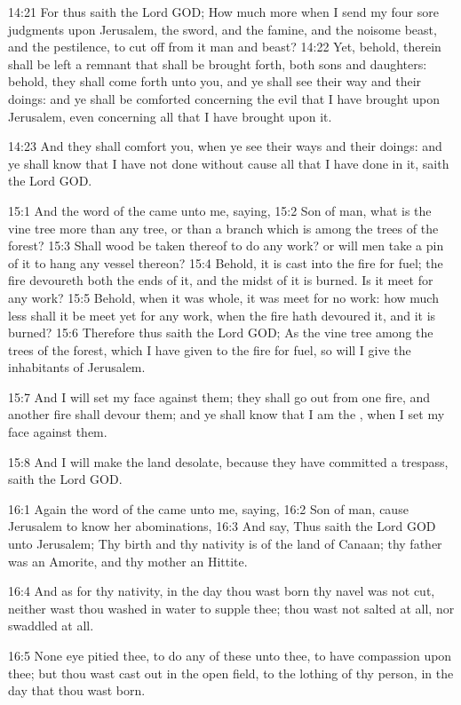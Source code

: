 14:21 For thus saith the Lord GOD; How much more when I send my four
sore judgments upon Jerusalem, the sword, and the famine, and the
noisome beast, and the pestilence, to cut off from it man and beast?
14:22 Yet, behold, therein shall be left a remnant that shall be
brought forth, both sons and daughters: behold, they shall come forth
unto you, and ye shall see their way and their doings: and ye shall be
comforted concerning the evil that I have brought upon Jerusalem, even
concerning all that I have brought upon it.

14:23 And they shall comfort you, when ye see their ways and their
doings: and ye shall know that I have not done without cause all that
I have done in it, saith the Lord GOD.

15:1 And the word of the \LORD came unto me, saying, 15:2 Son of man,
what is the vine tree more than any tree, or than a branch which is
among the trees of the forest?  15:3 Shall wood be taken thereof to do
any work? or will men take a pin of it to hang any vessel thereon?
15:4 Behold, it is cast into the fire for fuel; the fire devoureth
both the ends of it, and the midst of it is burned. Is it meet for any
work?  15:5 Behold, when it was whole, it was meet for no work: how
much less shall it be meet yet for any work, when the fire hath
devoured it, and it is burned?  15:6 Therefore thus saith the Lord
GOD; As the vine tree among the trees of the forest, which I have
given to the fire for fuel, so will I give the inhabitants of
Jerusalem.

15:7 And I will set my face against them; they shall go out from one
fire, and another fire shall devour them; and ye shall know that I am
the \LORD, when I set my face against them.

15:8 And I will make the land desolate, because they have committed a
trespass, saith the Lord GOD.

16:1 Again the word of the \LORD came unto me, saying, 16:2 Son of man,
cause Jerusalem to know her abominations, 16:3 And say, Thus saith the
Lord GOD unto Jerusalem; Thy birth and thy nativity is of the land of
Canaan; thy father was an Amorite, and thy mother an Hittite.

16:4 And as for thy nativity, in the day thou wast born thy navel was
not cut, neither wast thou washed in water to supple thee; thou wast
not salted at all, nor swaddled at all.

16:5 None eye pitied thee, to do any of these unto thee, to have
compassion upon thee; but thou wast cast out in the open field, to the
lothing of thy person, in the day that thou wast born.

